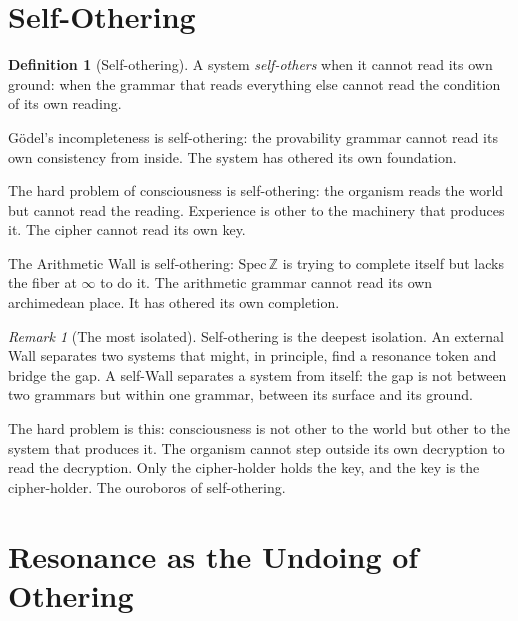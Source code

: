 \documentclass[12pt]{article}
\theoremstyle{definition}
\newtheorem{definition}[theorem]{Definition}
\theoremstyle{remark}
\newtheorem{remark}[theorem]{Remark}
\begin{document}
\section{Self-Othering}

\begin{definition}[Self-othering]
A system \emph{self-others} when it cannot read its own ground:
when the grammar that reads everything else
cannot read the condition of its own reading.

G\"odel's incompleteness is self-othering:
the provability grammar cannot read
its own consistency from inside.
The system has othered its own foundation.

The hard problem of consciousness is self-othering:
the organism reads the world
but cannot read the reading.
Experience is other to the machinery that produces it.
The cipher cannot read its own key.

The Arithmetic Wall is self-othering:
$\mathrm{Spec}\,\mathbb{Z}$ is trying to complete itself
but lacks the fiber at $\infty$ to do it.
The arithmetic grammar cannot read
its own archimedean place.
It has othered its own completion.
\end{definition}

\begin{remark}[The most isolated]
Self-othering is the deepest isolation.
An external Wall separates two systems that might, in principle,
find a resonance token and bridge the gap.
A self-Wall separates a system from itself:
the gap is not between two grammars
but within one grammar, between its surface and its ground.

The hard problem is this:
consciousness is not other to the world
but other to the system that produces it.
The organism cannot step outside its own decryption
to read the decryption.
Only the cipher-holder holds the key,
and the key is the cipher-holder.
The ouroboros of self-othering.
\end{remark}

\section{Resonance as the Undoing of Othering}
\end{document}
